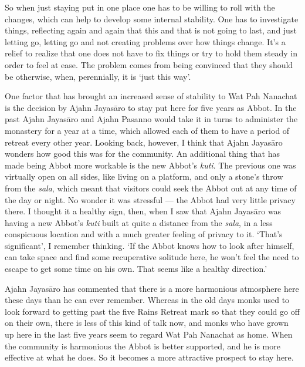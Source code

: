 So when just staying put in one place one has to be willing to roll with
the changes, which can help to develop some internal stability. One has
to investigate things, reflecting again and again that this and that is
not going to last, and just letting go, letting go and not creating
problems over how things change. It's a relief to realize that one does
not have to fix things or try to hold them steady in order to feel at
ease. The problem comes from being convinced that they should be
otherwise, when, perennially, it is `just this way'.

One factor that has brought an increased sense of stability to Wat Pah
Nanachat is the decision by Ajahn Jayasāro to stay put here for five
years as Abbot. In the past Ajahn Jayasāro and Ajahn Pasanno would take
it in turns to administer the monastery for a year at a time, which
allowed each of them to have a period of retreat every other year.
Looking back, however, I think that Ajahn Jayasāro wonders how good this
was for the community. An additional thing that has made being Abbot
more workable is the new Abbot's \emph{kuti}. The previous one was
virtually open on all sides, like living on a platform, and only a
stone's throw from the \emph{sala}, which meant that visitors could seek
the Abbot out at any time of the day or night. No wonder it was
stressful --- the Abbot had very little privacy there. I thought it a
healthy sign, then, when I saw that Ajahn Jayasāro was having a new
Abbot's \emph{kuti} built at quite a distance from the \emph{sala}, in a
less conspicuous location and with a much greater feeling of privacy to
it. `That's significant', I remember thinking. `If the Abbot knows how
to look after himself, can take space and find some recuperative
solitude here, he won't feel the need to escape to get some time on his
own. That seems like a healthy direction.'

Ajahn Jayasāro has commented that there is a more harmonious atmosphere
here these days than he can ever remember. Whereas in the old days monks
used to look forward to getting past the five Rains Retreat mark so that
they could go off on their own, there is less of this kind of talk now,
and monks who have grown up here in the last five years seem to regard
Wat Pah Nanachat as home. When the community is harmonious the Abbot is
better supported, and he is more effective at what he does. So it
becomes a more attractive prospect to stay here.

